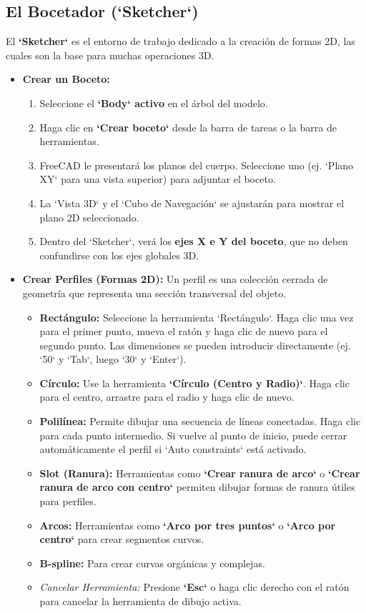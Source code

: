 \documentclass[12pt]{article}
\begin{document}
\subsection{El Bocetador (`Sketcher`)}
El \textbf{`Sketcher`} es el entorno de trabajo dedicado a la creación de formas 2D, las cuales son la base para muchas operaciones 3D.
\begin{itemize}[label=\textbullet]
    \item \textbf{Crear un Boceto:}
    \begin{enumerate}[label=\arabic*)]
        \item Seleccione el \textbf{`Body` activo} en el árbol del modelo.
        \item Haga clic en \textbf{`Crear boceto`} desde la barra de tareas o la barra de herramientas.
        \item FreeCAD le presentará los planos del cuerpo. Seleccione uno (ej. `Plano XY` para una vista superior) para adjuntar el boceto.
        \item La `Vista 3D` y el `Cubo de Navegación` se ajustarán para mostrar el plano 2D seleccionado.
        \item Dentro del `Sketcher`, verá los \textbf{ejes X e Y del boceto}, que no deben confundirse con los ejes globales 3D.
    \end{enumerate}
    \item \textbf{Crear Perfiles (Formas 2D):} Un perfil es una colección cerrada de geometría que representa una sección transversal del objeto.
    \begin{itemize}[label=\textendash]
        \item \textbf{Rectángulo:} Seleccione la herramienta `Rectángulo`. Haga clic una vez para el primer punto, mueva el ratón y haga clic de nuevo para el segundo punto. Las dimensiones se pueden introducir directamente (ej. `50` y `Tab`, luego `30` y `Enter`).
        \item \textbf{Círculo:} Use la herramienta \textbf{`Círculo (Centro y Radio)`}. Haga clic para el centro, arrastre para el radio y haga clic de nuevo.
        \item \textbf{Polilínea:} Permite dibujar una secuencia de líneas conectadas. Haga clic para cada punto intermedio. Si vuelve al punto de inicio, puede cerrar automáticamente el perfil si `Auto constraints` está activado.
        \item \textbf{Slot (Ranura):} Herramientas como \textbf{`Crear ranura de arco`} o \textbf{`Crear ranura de arco con centro`} permiten dibujar formas de ranura útiles para perfiles.
        \item \textbf{Arcos:} Herramientas como \textbf{`Arco por tres puntos`} o \textbf{`Arco por centro`} para crear segmentos curvos.
        \item \textbf{B-spline:} Para crear curvas orgánicas y complejas.
        \item \textit{Cancelar Herramienta:} Presione \textbf{`Esc`} o haga clic derecho con el ratón para cancelar la herramienta de dibujo activa.
    \end{itemize}


\end{itemize}
\end{document}
